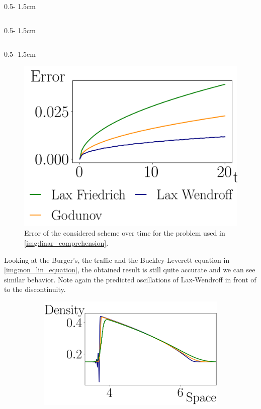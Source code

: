 \documentclass{uibposter}
\begin{document}
\begin{frame}[fragile]
\begin{columns}
\begin{column}{0.5\textwidth - 1.5cm}
\begin{column}{0.5\textwidth - 1.5cm}
\end{column}
\begin{column}{0.5\textwidth - 1.5cm}
	\vspace*{-1.7cm} 

   
    \begin{figure}
    	\includegraphics{fig/error_over_time.png}
    	\caption{Error of the considered scheme over time for the problem used in \cref{img:linar_comprehension}.}
    	\label{img:error_over_time}
    \end{figure}

Looking at the Burger's, the traffic and the Buckley-Leverett equation in \cref{img:non_lin_equation}, the obtained result is still quite accurate and we can see similar behavior. Note again the predicted oscillations of Lax-Wendroff in front of to the discontinuity.

\begin{figure}
	\begin{subfigure}{\textwidth}
	\includegraphics{fig/traffic_compare_.png}
	\end{subfigure}


\end{figure}
\end{column}
\end{column}
\end{columns}
\end{frame}
\end{document}
